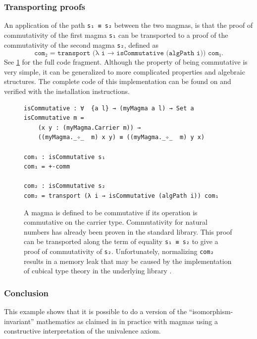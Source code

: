 \documentclass[12pt,a4paper,twoside,xetex]{book} %
\begin{document}
\subsubsection{Transporting proofs}


An application of the path \texttt{s₁ ≡ s₂} between the two magmas, is that the 
proof of commutativity of the first magma \texttt{s₁} can be transported to a 
proof of the commutativity of the second magma \texttt{s₂}, defined as 
$$\texttt{com₂ = transport (λ i → isCommutative (algPath i)) com₁}.$$ See \cref{comtrans} for the full code fragment. Although the 
property of being commutative is very simple, it can be generalized to more 
complicated properties and algebraic structures. The 
complete code of this implementation can be found on \cite{Van19} and verified 
with the installation instructions.

\begin{figure}\label{comtrans}
\begin{center}
\begin{BVerbatim}
isCommutative : ∀  {a l} → (myMagma a l) → Set a
isCommutative m = 
    (x y : (myMagma.Carrier m)) → 
    ((myMagma._✧_  m) x y) ≡ ((myMagma._✧_  m) y x)

com₁ : isCommutative s₁
com₁ = +-comm

com₂ : isCommutative s₂
com₂ = transport (λ i → isCommutative (algPath i)) com₁
\end{BVerbatim}
\end{center}
\caption{A magma is defined to be commutative if its operation is 
commutative on the carrier type. Commutativity for natural numbers has already 
been proven in the standard library. This proof can be transported along the 
term of equality \texttt{s₁ ≡ s₂} to give a proof of commutativity of 
\texttt{s₂}. Unfortunately, normalizing \texttt{com₂} results in a memory leak that may be caused by the implementation of cubical type theory in the underlying library \cite{Moertberg2018}.}
\end{figure}

\subsubsection{Conclusion}

This example shows that it is possible to do a version of the ``isomorphism-invariant'' mathematics as claimed in \cite{Voevodsky2013} in practice with magmas using a constructive interpretation of the univalence axiom. 
\end{document}
